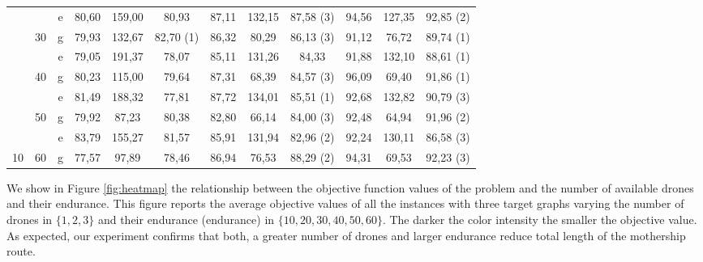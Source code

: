 \begin{table}[h!]
{\begin{tabular}{|c|c|c|ccc|ccc|ccc|}
 &  & e & 80,60 & 159,00 & 80,93 & 87,11 & 132,15 & {\color[HTML]{FE0000} 87,58 (3)} & 94,56 & 127,35 & {\color[HTML]{FE0000} 92,85 (2)} \\ \cline{3-3}
 & \multirow{-2}{*}{30} & g & 79,93 & 132,67 & {\color[HTML]{FE0000} 82,70 (1)} & 86,32 & 80,29 & {\color[HTML]{FE0000} 86,13 (3)} & 91,12 & 76,72 & {\color[HTML]{FE0000} 89,74 (1)} \\ \cline{2-12} 
 &  & e & 79,05 & 191,37 & 78,07 & 85,11 & 131,26 & 84,33 & 91,88 & 132,10 & {\color[HTML]{FE0000} 88,61 (1)} \\ \cline{3-3}
 & \multirow{-2}{*}{40} & g & 80,23 & 115,00 & 79,64 & 87,31 & 68,39 & {\color[HTML]{FE0000} 84,57 (3)} & 96,09 & 69,40 & {\color[HTML]{FE0000} 91,86 (1)} \\ \cline{2-12} 
 &  & e & 81,49 & 188,32 & 77,81 & 87,72 & 134,01 & {\color[HTML]{FE0000} 85,51 (1)} & 92,68 & 132,82 & {\color[HTML]{FE0000} 90,79 (3)} \\ \cline{3-3}
 & \multirow{-2}{*}{50} & g & 79,92 & 87,23 & 80,38 & 82,80 & 66,14 & {\color[HTML]{FE0000} 84,00 (3)} & 92,48 & 64,94 & {\color[HTML]{FE0000} 91,96 (2)} \\ \cline{2-12} 
 &  & e & 83,79 & 155,27 & 81,57 & 85,91 & 131,94 & {\color[HTML]{FE0000} 82,96 (2)} & 92,24 & 130,11 & {\color[HTML]{FE0000} 86,58 (3)} \\ \cline{3-3}
\multirow{-10}{*}{10} & \multirow{-2}{*}{60} & g & 77,57 & 97,89 & 78,46 & 86,94 & 76,53 & {\color[HTML]{FE0000} 88,29 (2)} & 94,31 & 69,53 & {\color[HTML]{FE0000} 92,23 (3)} \\ \hline
\end{tabular}%
}
\end{table}

\noindent
We show in Figure \ref{fig:heatmap} the relationship between the objective function values of the problem and the number of available drones and their endurance. This figure reports the average objective values of all the instances with three target graphs varying the number of drones in $\{1,2,3\}$ and their endurance (endurance) in $\{10,20,30,40,50,60\}$. The darker the color intensity the smaller the objective value. As expected, our experiment confirms that both, a greater number of drones and larger endurance reduce total length of the mothership route.

